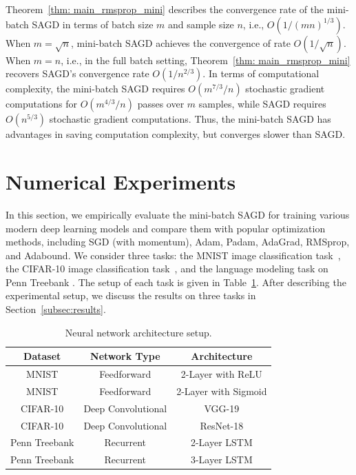 \documentclass[11pt]{article}
\begin{document}
Theorem~\ref{thm: main_rmsprop_mini} 
describes the convergence rate of the mini-batch \textsc{SAGD} in terms of batch size $m$ and sample size $n$, i.e., $O(1/(mn)^{1/3})$. 
When $m = \sqrt{n}$, mini-batch \textsc{SAGD} achieves the convergence of rate $O(1/\sqrt{n})$. When $m=n$, i.e., in the full batch setting, Theorem~\ref{thm: main_rmsprop_mini} recovers \textsc{SAGD}'s convergence rate  $O(1/n^{2/3})$. 
In terms of computational complexity, the mini-batch \textsc{SAGD} requires $O(m^{7/3}/n)$ stochastic gradient computations for $O(m^{4/3}/n)$ passes over $m$ samples, while \textsc{SAGD} requires $O(n^{5/3})$ stochastic gradient computations. Thus, the mini-batch \textsc{SAGD} has advantages in saving computation complexity, but converges slower than \textsc{SAGD}.







\section{Numerical Experiments} \label{sec: experiment}
In this section, we empirically evaluate the mini-batch \textsc{SAGD}
for training various modern deep
learning models and compare them with popular optimization methods, including SGD (with momentum), Adam, Padam,  AdaGrad,  RMSprop, and Adabound. 
We consider three tasks: the MNIST image classification task~\citep{lebo1998}, the CIFAR-10 image
classification task~\citep{krhi2009}, and the language modeling task on Penn Treebank
\citep{mama1993}. The setup of each task is given in Table~\ref{tab::network_setup}. 
After describing the experimental setup, we discuss the results on three tasks in Section~\ref{subsec:results}.

\begin{table}[h]
	\centering
		\caption{Neural network architecture setup.}
	\label{tab::network_setup}
	\begin{tabular}{ccc}	
	\toprule[2pt]
	\textbf{Dataset} & \textbf{Network Type}    & \textbf{Architecture} \\ 	
	\toprule[1pt]
		MNIST            & Feedforward     & 2-Layer with ReLU    \\
		MNIST            & Feedforward  & 2-Layer with Sigmoid   \\
		CIFAR-10         & Deep Convolutional       & VGG-19                \\
		CIFAR-10         & Deep Convolutional       & ResNet-18             \\
		Penn Treebank    & Recurrent                & 2-Layer LSTM          \\
		Penn Treebank    & Recurrent                & 3-Layer LSTM          \\ 
		\toprule[1pt]
	\end{tabular}
\end{table}
\end{document}
